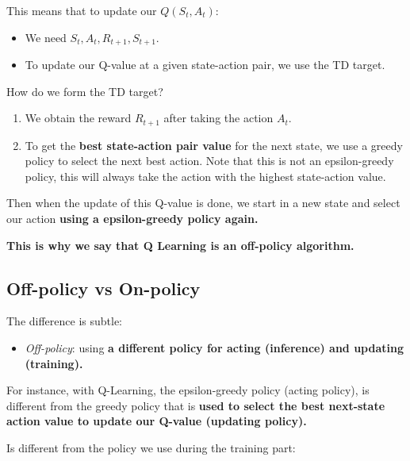 \documentclass[11pt,a4paper]{article}
\begin{document}
This means that to update our \(Q(S_t, A_t)\):

\begin{itemize}
\tightlist
\item
  We need \(S_t, A_t, R_{t+1}, S_{t+1}\).
\item
  To update our Q-value at a given state-action pair, we use the TD target.
\end{itemize}

How do we form the TD target?

\begin{enumerate}
\def\labelenumi{\arabic{enumi}.}
\tightlist
\item
  We obtain the reward \(R_{t+1}\) after taking the action \(A_t\).
\item
  To get the \textbf{best state-action pair value} for the next state, we use a greedy policy to select the next best action. Note that this is not an epsilon-greedy policy, this will always take the action with the highest state-action value.
\end{enumerate}

Then when the update of this Q-value is done, we start in a new state and select our action \textbf{using a epsilon-greedy policy again.}

\textbf{This is why we say that Q Learning is an off-policy algorithm.}

\subsection{Off-policy vs On-policy}\label{off-policy-vs-on-policy}

The difference is subtle:

\begin{itemize}
\tightlist
\item
  \emph{Off-policy}: using \textbf{a different policy for acting (inference) and updating (training).}
\end{itemize}

For instance, with Q-Learning, the epsilon-greedy policy (acting policy), is different from the greedy policy that is \textbf{used to select the best next-state action value to update our Q-value (updating policy).}


Is different from the policy we use during the training part:
\end{document}
